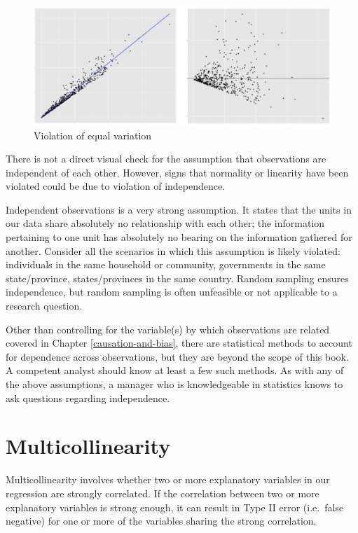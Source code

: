 \documentclass[
]{book}
\begin{document}
\begin{figure}

{\centering \includegraphics[width=\textwidth]{images/rvfp_equal} 

}

\caption{Violation of equal variation}\label{fig:rvfpequal}
\end{figure}

There is not a direct visual check for the assumption that observations are independent of each other. However, signs that normality or linearity have been violated could be due to violation of independence.

Independent observations is a very strong assumption. It states that the units in our data share absolutely no relationship with each other; the information pertaining to one unit has absolutely no bearing on the information gathered for another. Consider all the scenarios in which this assumption is likely violated: individuals in the same household or community, governments in the same state/province, states/provinces in the same country. Random sampling ensures independence, but random sampling is often unfeasible or not applicable to a research question.

Other than controlling for the variable(s) by which observations are related covered in Chapter \ref{causation-and-bias}, there are statistical methods to account for dependence across observations, but they are beyond the scope of this book. A competent analyst should know at least a few such methods. As with any of the above assumptions, a manager who is knowledgeable in statistics knows to ask questions regarding independence.

\hypertarget{multicollinearity}{%
\section{Multicollinearity}\label{multicollinearity}}

Multicollinearity involves whether two or more explanatory variables in our regression are strongly correlated. If the correlation between two or more explanatory variables is strong enough, it can result in Type II error (i.e.~false negative) for one or more of the variables sharing the strong correlation.
\end{document}
